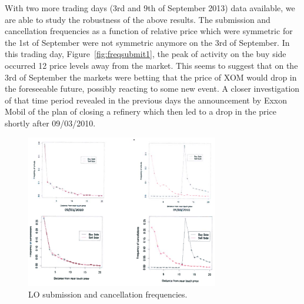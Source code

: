 With two more trading days (3rd and 9th of September 2013) data available, we are able to study the robustness of the above results. The submission and cancellation frequencies as a function of relative price which were symmetric for the 1st of September were not symmetric anymore on the 3rd of September. In this trading day, Figure~\ref{fig:freqsubmit1}, the peak of activity on the buy side occurred 12 price levels away from the market. This seems to suggest that on the 3rd of September the markets were betting that the price of XOM would drop in the foreseeable future, possibly reacting to some new event. A closer investigation of that time period revealed in the previous days the announcement by Exxon Mobil of the plan of closing a refinery which then led to a drop in the price shortly after 09/03/2010.
	\begin{figure}[!ht]
   	\centering
   	\includegraphics[width=0.75\textwidth]{chapters/chapter_el_exch/figures/losubcanfreq.png} 
   	\caption{LO submission and cancellation frequencies. \label{fig:losubcanfreq}}
	\end{figure}


